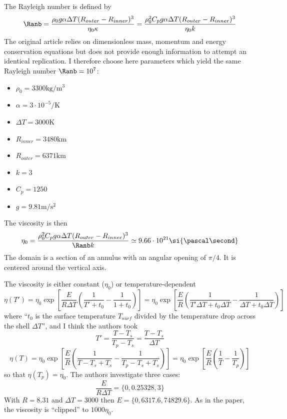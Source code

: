 The Rayleigh number is defined by
\[
\Ranb 
= \frac{\rho_0 g \alpha \Delta T (R_{outer}-R_{inner})^3}{\eta_0 \kappa}
=\frac{\rho_0^2 C_p g \alpha \Delta T (R_{outer}-R_{inner})^3}{\eta_0 k}
\]
The original article relies on dimensionless mass, momentum and energy conservation equations
but does not provide enough information to attempt an identical replication. I therefore 
choose here parameters which yield the same Rayleigh number $\Ranb=10^7$:
\begin{itemize}
\item $\rho_0=3300\si{\kg\per\cubic\metre}$
\item $\alpha=3\cdot 10^{-5} \si{\per\kelvin}$
\item $\Delta T=3000\si{\kelvin}$
\item $R_{inner}=3480\si{\km}$
\item $R_{outer}=6371\si{\km}$
\item $k=3$
\item $C_p=1250$
\item $g=9.81\si{\metre\per\square\second}$
\end{itemize}
The viscosity is then 
\[
\eta_0
=\frac{\rho_0^2 C_p g \alpha \Delta T (R_{outer}-R_{inner})^3}{\Ranb k}
\simeq 9.66 \cdot 10^{21}\si{\pascal\second}
\]
The domain is a section of an annulus with an angular opening of $\pi/4$. 
It is centered around the vertical axis. 



The viscosity is either constant ($\eta_0$) or temperature-dependent 
\[
\eta(T')
=\eta_0 \exp\left[ \frac{E}{R \Delta T} \left( \frac{1}{T'+t_0} -\frac{1}{1+t_0}  \right)   \right]
=\eta_0 \exp\left[ \frac{E}{R} \left( \frac{1}{T' \Delta T  +t_0 \Delta T} -\frac{1}{\Delta T +t_0 \Delta T}  \right)   \right]
\]
where ``$t_0$ is the surface temperature $T_{surf}$ divided by 
the temperature drop across the shell $\Delta T$'', and 
I think the authors took 
\[
T'=\frac{T-T_s}{T_p-T_s}= \frac{T-T_s}{\Delta T}
\]
\[
\eta(T)
=\eta_0 \exp\left[ \frac{E}{R} \left( \frac{1}{T-T_s  + T_s} -\frac{1}{T_p-T_s + T_s}  \right)   \right]
=\eta_0 \exp\left[ \frac{E}{R} \left( \frac{1}{T} -\frac{1}{T_p}  \right)   \right]
\]
so that $\eta(T_p)=\eta_0$. 
The authors investigate three cases:
\[
\frac{E}{R \Delta T} = \{0,0.25328,3\}
\]
With $R=8.31$ and $\Delta T=3000$ then $E=\{ 0, 6317.6 , 74829.6 \}$.
As in the paper, the viscosity is ``clipped'' to $1000\eta_0$.



